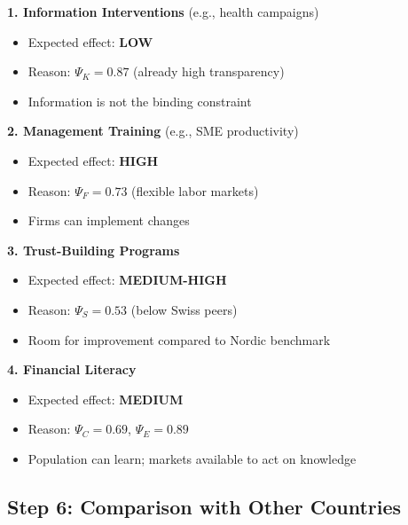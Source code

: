 \begin{tcolorbox}[colback=yellow!10!white, colframe=yellow!75!black, 
    title=\textbf{Intervention Predictions for Switzerland}]

\textbf{1. Information Interventions} (e.g., health campaigns)
\begin{itemize}[nosep]
    \item Expected effect: \textbf{LOW}
    \item Reason: $\Psi_K = 0.87$ (already high transparency)
    \item Information is not the binding constraint
\end{itemize}

\textbf{2. Management Training} (e.g., SME productivity)
\begin{itemize}[nosep]
    \item Expected effect: \textbf{HIGH}
    \item Reason: $\Psi_F = 0.73$ (flexible labor markets)
    \item Firms can implement changes
\end{itemize}

\textbf{3. Trust-Building Programs}
\begin{itemize}[nosep]
    \item Expected effect: \textbf{MEDIUM-HIGH}
    \item Reason: $\Psi_S = 0.53$ (below Swiss peers)
    \item Room for improvement compared to Nordic benchmark
\end{itemize}

\textbf{4. Financial Literacy}
\begin{itemize}[nosep]
    \item Expected effect: \textbf{MEDIUM}
    \item Reason: $\Psi_C = 0.69$, $\Psi_E = 0.89$
    \item Population can learn; markets available to act on knowledge
\end{itemize}

\end{tcolorbox}

\subsection{Step 6: Comparison with Other Countries}

